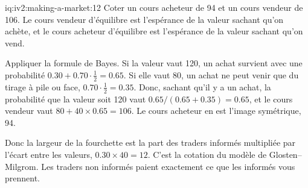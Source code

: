 \begin{solution}{iq:iv2:making-a-market:12}
Coter un cours acheteur de 94 et un cours vendeur de 106. Le cours vendeur d'équilibre est l'espérance de la valeur sachant qu'on achète, et le cours acheteur d'équilibre est l'espérance de la valeur sachant qu'on vend.

Appliquer la formule de Bayes. Si la valeur vaut 120, un achat survient avec une probabilité $0.30 + 0.70 \cdot \tfrac12 = 0.65$. Si elle vaut 80, un achat ne peut venir que du tirage à pile ou face, $0.70 \cdot \tfrac12 = 0.35$. Donc, sachant qu'il y a un achat, la probabilité que la valeur soit 120 vaut $0.65/(0.65 + 0.35) = 0.65$, et le cours vendeur vaut $80 + 40 \times 0.65 = 106$. Le cours acheteur en est l'image symétrique, 94.

Donc la largeur de la fourchette est la part des traders informés multipliée par l'écart entre les valeurs, $0.30 \times 40 = 12$. C'est la cotation du modèle de Glosten--Milgrom. Les traders non informés paient exactement ce que les informés vous prennent.

\end{solution}

